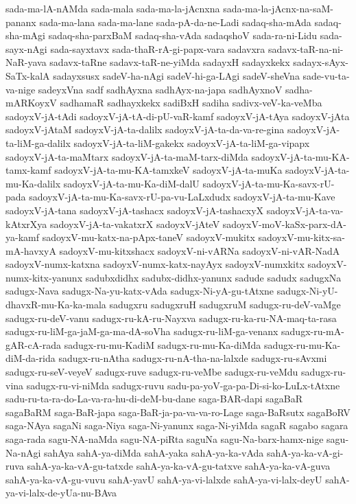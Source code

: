 {sada-ma-lA-nAMda
sada-mala
sada-ma-la-jAcnxna
sada-ma-la-jAcnx-na-saM-pananx
sada-ma-lana
sada-ma-lane
sada-pA-da-ne-Ladi
sadaq-sha-mAda
sadaq-sha-mAgi
sadaq-sha-parxBaM
sadaq-sha-vAda
sadaqshoV
sada-ra-ni-Lidu
sada-sayx-nAgi
sada-sayxtavx
sada-thaR-rA-gi-papx-vara
sadavxra
sadavx-taR-na-ni-NaR-yava
sadavx-taRne
sadavx-taR-ne-yiMda
sadayxH
sadayxkekx
sadayx-sAyx-SaTx-kalA
sadayxsusx
sadeV-ha-nAgi
sadeV-hi-ga-LAgi
sadeV-sheVna
sade-vu-ta-va-nige
sadeyxVna
sadf
sadhAyxna
sadhAyx-na-japa
sadhAyxnoV
sadha-mARKoyxV
sadhamaR
sadhayxkekx
sadiBxH
sadiha
sadivx-veV-ka-veMba
sadoyxV-jA-tAdi
sadoyxV-jA-tA-di-pU-vaR-kamf
sadoyxV-jA-tAya
sadoyxV-jAta
sadoyxV-jAtaM
sadoyxV-jA-ta-dalilx
sadoyxV-jA-ta-da-va-re-gina
sadoyxV-jA-ta-liM-ga-dalilx
sadoyxV-jA-ta-liM-gakekx
sadoyxV-jA-ta-liM-ga-vipapx
sadoyxV-jA-ta-maMtarx
sadoyxV-jA-ta-maM-tarx-diMda
sadoyxV-jA-ta-mu-KA-tamx-kamf
sadoyxV-jA-ta-mu-KA-tamxkeV
sadoyxV-jA-ta-muKa
sadoyxV-jA-ta-mu-Ka-dalilx
sadoyxV-jA-ta-mu-Ka-diM-dalU
sadoyxV-jA-ta-mu-Ka-savx-rU-pada
sadoyxV-jA-ta-mu-Ka-savx-rU-pa-vu-LaLxdudx
sadoyxV-jA-ta-mu-Kave
sadoyxV-jA-tana
sadoyxV-jA-tashacx
sadoyxV-jA-tashacxyX
sadoyxV-jA-ta-va-kAtxrXya
sadoyxV-jA-ta-vakatxrX
sadoyxV-jAteV
sadoyxV-moV-kaSx-parx-dA-ya-kamf
sadoyxV-mu-katx-na-pApx-taneV
sadoyxV-mukitx
sadoyxV-mu-kitx-sa-mA-havxyA
sadoyxV-mu-kitxshacx
sadoyxV-ni-vARNa
sadoyxV-ni-vAR-NadA
sadoyxV-numx-katxna
sadoyxV-numx-katx-nayAyx
sadoyxV-numxkitx
sadoyxV-numx-kitx-yanunx
sadubxdidhx
sadubx-didhx-yanunx
sadude
sadudx
sadugxNa
sadugx-Nava
sadugx-Na-yu-katx-vAda
sadugx-Ni-yA-gu-tAtxne
sadugx-Ni-yU-dhavxR-mu-Ka-ka-mala
sadugxru
sadugxruH
sadugxruM
sadugx-ru-deV-vaMge
sadugx-ru-deV-vanu
sadugx-ru-kA-ru-Nayxva
sadugx-ru-ka-ru-NA-maq-ta-rasa
sadugx-ru-liM-ga-jaM-ga-ma-dA-soVha
sadugx-ru-liM-ga-venanx
sadugx-ru-mA-gAR-cA-rada
sadugx-ru-mu-KadiM
sadugx-ru-mu-Ka-diMda
sadugx-ru-mu-Ka-diM-da-rida
sadugx-ru-nAtha
sadugx-ru-nA-tha-na-lalxde
sadugx-ru-sAvxmi
sadugx-ru-seV-veyeV
sadugx-ruve
sadugx-ru-veMbe
sadugx-ru-veMdu
sadugx-ru-vina
sadugx-ru-vi-niMda
sadugx-ruvu
sadu-pa-yoV-ga-pa-Di-si-ko-LuLx-tAtxne
sadu-ru-ta-ra-do-La-va-ra-hu-di-deM-bu-dane
saga-BAR-dapi
sagaBaR
sagaBaRM
saga-BaR-japa
saga-BaR-ja-pa-va-va-ro-Lage
saga-BaRsutx
sagaBoRV
saga-NAya
sagaNi
saga-Niya
saga-Ni-yanunx
saga-Ni-yiMda
sagaR
sagabo
sagara
saga-rada
sagu-NA-naMda
sagu-NA-piRta
saguNa
sagu-Na-barx-hamx-nige
sagu-Na-nAgi
sahAya
sahA-ya-diMda
sahA-yaka
sahA-ya-ka-vAda
sahA-ya-ka-vA-gi-ruva
sahA-ya-ka-vA-gu-tatxde
sahA-ya-ka-vA-gu-tatxve
sahA-ya-ka-vA-guva
sahA-ya-ka-vA-gu-vuvu
sahA-yavU
sahA-ya-vi-lalxde
sahA-ya-vi-lalx-deyU
sahA-ya-vi-lalx-de-yUa-nu-BAva
}
